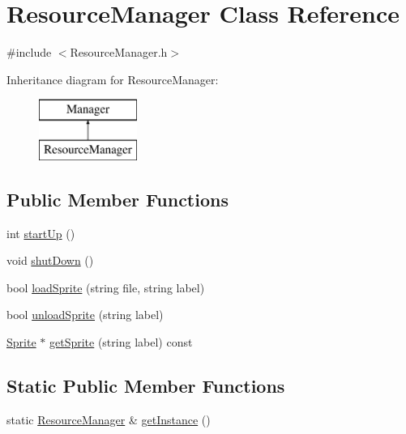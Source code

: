 \hypertarget{class_resource_manager}{\section{Resource\+Manager Class Reference}
\label{class_resource_manager}
}


{\ttfamily \#include $<$Resource\+Manager.\+h$>$}

Inheritance diagram for Resource\+Manager\+:\begin{figure}[H]
\begin{center}
\leavevmode
\includegraphics[height=2.000000cm]{class_resource_manager}
\end{center}
\end{figure}
\subsection*{Public Member Functions}
\begin{DoxyCompactItemize}
\item 
int \hyperlink{class_resource_manager_a53bf358b029e050a285725bc70a8550a}{start\+Up} ()
\item 
void \hyperlink{class_resource_manager_a6db779a2721e927cffb9f0c7ab31495c}{shut\+Down} ()
\item 
bool \hyperlink{class_resource_manager_aadd9ea4561168835c5c8eec0d7ff6f53}{load\+Sprite} (string file, string label)
\item 
bool \hyperlink{class_resource_manager_a6e7ab1b45dc7e6fa9abcbce827f5ddad}{unload\+Sprite} (string label)
\item 
\hyperlink{class_sprite}{Sprite} $\ast$ \hyperlink{class_resource_manager_a42c23fc9feb582cd7cc0987361ba4c6d}{get\+Sprite} (string label) const 
\end{DoxyCompactItemize}
\subsection*{Static Public Member Functions}
\begin{DoxyCompactItemize}
\item 
static \hyperlink{class_resource_manager}{Resource\+Manager} \& \hyperlink{class_resource_manager_a37d0e97686c031cef9b22725ba4a6005}{get\+Instance} ()
\end{DoxyCompactItemize}



